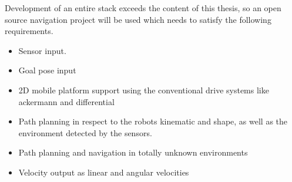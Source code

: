 Development of an entire stack exceeds the content of this thesis, so an open source navigation project will be used which needs to satisfy the following requirements.
\begin{itemize}
	\item Sensor input.
	\item Goal pose input
	\item 2D mobile platform support using the conventional drive systems like ackermann and differential
	\item Path planning in respect to the robots kinematic and shape, as well as the environment detected by the sensors.
	\item Path planning and navigation in totally unknown environments
	\item Velocity output as linear and angular velocities
\end{itemize}


